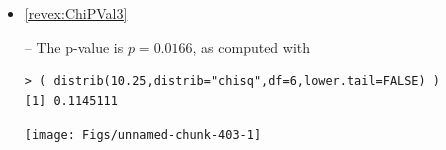 \documentclass[10pt,openany]{book}\usepackage[]{graphicx}\usepackage[]{color}
\makeatletter
\newenvironment{kframe}{%
 \def\at@end@of@kframe{}%
 \ifinner\ifhmode%
  \def\at@end@of@kframe{\end{minipage}}%
  \begin{minipage}{\columnwidth}%
 \fi\fi%
 \def\FrameCommand##1{\hskip\@totalleftmargin \hskip-\fboxsep
 \colorbox{shadecolor}{##1}\hskip-\fboxsep
     \hskip-\linewidth \hskip-\@totalleftmargin \hskip\columnwidth}%
 \MakeFramed {\advance\hsize-\width
   \@totalleftmargin\z@ \linewidth\hsize
   \@setminipage}}%
 {\par\unskip\endMakeFramed%
 \at@end@of@kframe}
\newenvironment{knitrout}{}{} %
\makeatother
\begin{document}
\begin{itemize}
\begin{knitrout}
{}



\end{knitrout}
  \item \hypertarget{ans:ChiPVal3}{\ref{revex:ChiPVal3}} -- The p-value is $p=0.0166$, as computed with
\begin{knitrout}
\color{fgcolor}\begin{kframe}
\begin{verbatim}
> ( distrib(10.25,distrib="chisq",df=6,lower.tail=FALSE) )
[1] 0.1145111
\end{verbatim}
\end{kframe}

{\centering \texttt{[image: Figs/unnamed-chunk-403-1]} 

}




\end{knitrout}
\end{itemize}
\end{document}

